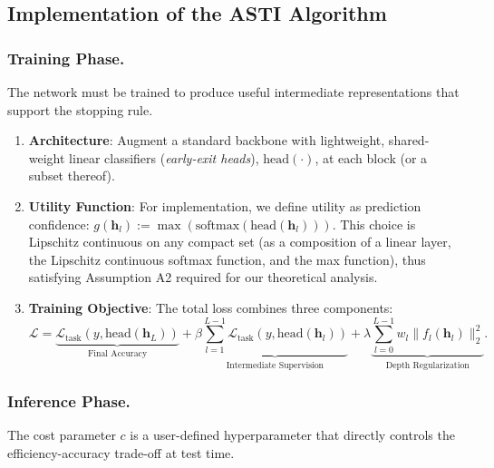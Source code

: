 \documentclass[12pt]{imsart}
\newcommand{\h}{\mathbf{h}}
\theoremstyle{plain}
\theoremstyle{definition}
\begin{document}
\subsection{Implementation of the ASTI Algorithm}
\subsubsection{Training Phase.}
The network must be trained to produce useful intermediate representations that support the stopping rule.
\begin{enumerate}
    \item \textbf{Architecture}: Augment a standard backbone with lightweight, shared-weight linear classifiers (\textit{early-exit heads}), $\text{head}(\cdot)$, at each block (or a subset thereof).
    \item \textbf{Utility Function}: For implementation, we define utility as prediction confidence: $g(\h_l) := \max\left(\text{softmax}(\text{head}(\h_l))\right)$. This choice is Lipschitz continuous on any compact set (as a composition of a linear layer, the Lipschitz continuous softmax function, and the max function), thus satisfying Assumption A2 required for our theoretical analysis.
    \item \textbf{Training Objective}: The total loss combines three components:
    \begin{equation} \label{eq:asti_loss}
    \mathcal{L} = \underbrace{\mathcal{L}_{\text{task}}(y, \text{head}(\h_L))}_{\text{Final Accuracy}} + \beta \underbrace{\sum_{l=1}^{L-1} \mathcal{L}_{\text{task}}(y, \text{head}(\h_l))}_{\text{Intermediate Supervision}} + \lambda \underbrace{\sum_{l=0}^{L-1} w_l \|f_l(\h_l)\|_2^2}_{\text{Depth Regularization}}.
    \end{equation}
\end{enumerate}

\subsubsection{Inference Phase.}
The cost parameter $c$ is a user-defined hyperparameter that directly controls the efficiency-accuracy trade-off at test time.
\end{document}
